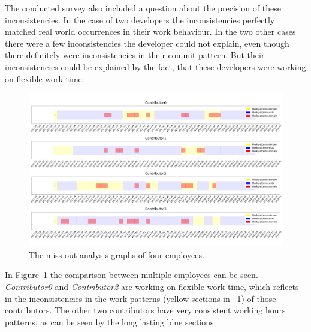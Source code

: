 The conducted survey also included a question about the precision of these inconsistencies.
In the case of two developers the inconsistencies perfectly matched real world occurrences in their work behaviour.
In the two other cases there were a few inconsistencies the developer could not explain, even though there definitely were inconsistencies in their commit pattern.
But their inconsistencies could be explained by the fact, that these developers were working on flexible work time.

\begin{figure}[H]
    \includegraphics[scale=0.20]{./graphs/analysis/work-time-analysis-comparison}
    \centering
    \caption{The miss-out analysis graphs of four employees.}\label{fig:miss-out-comparison}
\end{figure}

In Figure~\ref{fig:miss-out-comparison} the comparison between multiple employees can be seen.
\emph{Contributor0} and \emph{Contributor2} are working on flexible work time, which reflects in the inconsistencies in the work patterns (yellow sections in ~\ref{fig:miss-out-comparison}) of those contributors.
The other two contributors have very consistent working hours patterns, as can be seen by the long lasting blue sections.
